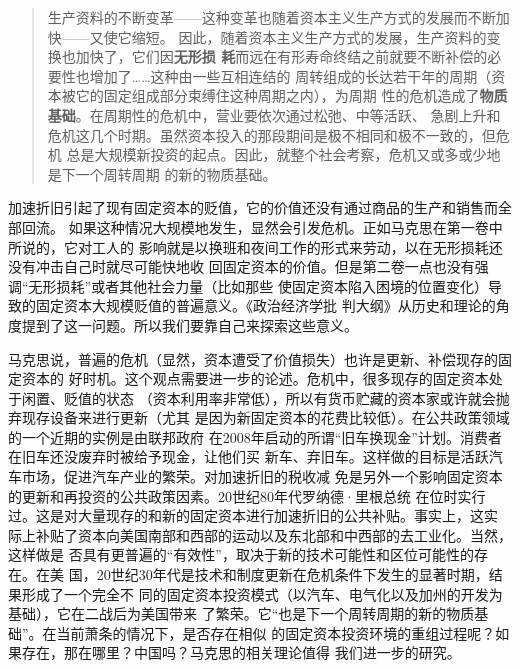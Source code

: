 \begin{quotation}
  生产资料的不断变革——这种变革也随着资本主义生产方式的发展而不断加快——又使它缩短。
  因此，随着资本主义生产方式的发展，生产资料的变换也加快了，它们因\textbf{无形损
    耗}而远在有形寿命终结之前就要不断补偿的必要性也增加了……这种由一些互相连结的
  周转组成的长达若干年的周期（资本被它的固定组成部分束缚住这种周期之内），为周期
  性的危机造成了\textbf{物质基础}。在周期性的危机中，营业要依次通过松弛、中等活跃、
  急剧上升和危机这几个时期。虽然资本投入的那段期间是极不相同和极不一致的，但危机
  总是大规模新投资的起点。因此，就整个社会考察，危机又或多或少地是下一个周转周期
  的新的物质基础。

\end{quotation}
加速折旧引起了现有固定资本的贬值，它的价值还没有通过商品的生产和销售而全部回流。
如果这种情况大规模地发生，显然会引发危机。正如马克思在第一卷中所说的，它对工人的
影响就是以换班和夜间工作的形式来劳动，以在无形损耗还没有冲击自己时就尽可能快地收
回固定资本的价值。但是第二卷一点也没有强调“无形损耗”或者其他社会力量（比如那些
使固定资本陷入困境的位置变化）导致的固定资本大规模贬值的普遍意义。《政治经济学批
判大纲》从历史和理论的角度提到了这一问题。所以我们要靠自己来探索这些意义。




马克思说，普遍的危机（显然，资本遭受了价值损失）也许是更新、补偿现存的固定资本的
好时机。这个观点需要进一步的论述。危机中，很多现存的固定资本处于闲置、贬值的状态
（资本利用率非常低），所以有货币贮藏的资本家或许就会抛弃现存设备来进行更新（尤其
是因为新固定资本的花费比较低）。在公共政策领域的一个近期的实例是由联邦政府
在2008年启动的所谓“旧车换现金”计划。消费者在旧车还没废弃时被给予现金，让他们买
新车、弃旧车。这样做的目标是活跃汽车市场，促进汽车产业的繁荣。对加速折旧的税收减
免是另外一个影响固定资本的更新和再投资的公共政策因素。20世纪80年代罗纳德·里根总统
在位时实行过。这是对大量现存的和新的固定资本进行加速折旧的公共补贴。事实上，这实
际上补贴了资本向美国南部和西部的运动以及东北部和中西部的去工业化。当然，这样做是
否具有更普遍的“有效性”，取决于新的技术可能性和区位可能性的存在。在美
国，20世纪30年代是技术和制度更新在危机条件下发生的显著时期，结果形成了一个完全不
同的固定资本投资模式（以汽车、电气化以及加州的开发为基础），它在二战后为美国带来
了繁荣。它“也是下一个周转周期的新的物质基础”。在当前萧条的情况下，是否存在相似
的固定资本投资环境的重组过程呢？如果存在，那在哪里？中国吗？马克思的相关理论值得
我们进一步的研究。

